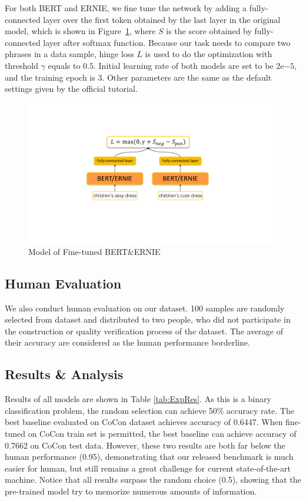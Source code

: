 For both BERT and ERNIE, we fine tune the network by adding a fully-connected layer over the first token obtained by the last layer in the original model, which is shown in Figure~\ref{fig:tuneNet}, where $S$ is the score obtained by fully-connected layer after softmax function. Because our task needs to compare two phrases in a data sample, hinge loss $L$ is used to do the optimization with threshold $\gamma$ equals to $0.5$. Initial learning rate of both models are set to be %
$2\mathrm{e}{-5}$, and the training epoch is 3. Other parameters are the same as the default settings given by the official tutorial.

\begin{figure}[h!]
	\centering
	\includegraphics[width=0.8\columnwidth]{images/fineTuneNetwork.pdf}
	\caption{Model of Fine-tuned BERT\&ERNIE}
	\label{fig:tuneNet}
\end{figure}


\subsection{Human Evaluation}
We also conduct human evaluation on our dataset. 100 samples are randomly selected from dataset and distributed to two people, who did not participate in the construction or quality verification process of the dataset. The average of their accuracy are considered as the human performance borderline. 


\subsection{Results \& Analysis}
Results of all models are shown in Table \ref{tab:ExpRes}. As this is a binary classification problem, the random selection can achieve 50\% accuracy rate. 
The best baseline evaluated on CoCon dataset achieves accuracy of 0.6447. When fine-tuned on CoCon train set is permitted, the best baseline can achieve accuracy of 0.7662 on CoCon test data. However, these two results are both far below the human performance (0.95), demonstrating that our released benchmark is much easier for human, but still remains a great challenge for current state-of-the-art machine. Notice that all results surpass the random choice (0.5), showing that the pre-trained model %
try to memorize numerous amounts of information.


